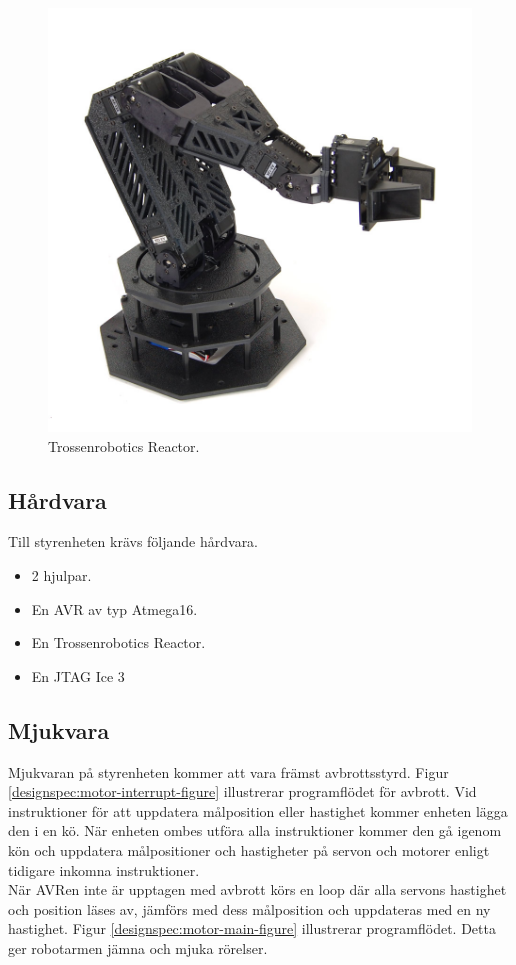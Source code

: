 \begin{figure}[h]
\center
\includegraphics[scale=0.35]{arm}
\caption{Trossenrobotics Reactor.}
\end{figure}

\subsection{Hårdvara}

Till styrenheten krävs följande hårdvara.
\begin{itemize}
\item{2 hjulpar.}
\item{En AVR av typ Atmega16.}
\item{En Trossenrobotics Reactor.}
\item{En JTAG Ice 3}
\end{itemize}

\subsection{Mjukvara}

Mjukvaran på styrenheten kommer att vara främst avbrottsstyrd. Figur \ref{designspec:motor-interrupt-figure} illustrerar programflödet för avbrott. Vid instruktioner för att uppdatera målposition eller hastighet kommer enheten lägga den i en kö. När enheten ombes utföra alla instruktioner kommer den gå igenom kön och uppdatera målpositioner och hastigheter på servon och motorer enligt tidigare inkomna instruktioner. \\
När AVRen inte är upptagen med avbrott körs en loop där alla servons hastighet och position läses av, jämförs med dess målposition och uppdateras med en ny hastighet. Figur \ref{designspec:motor-main-figure} illustrerar programflödet. Detta ger robotarmen jämna och mjuka rörelser. \\

